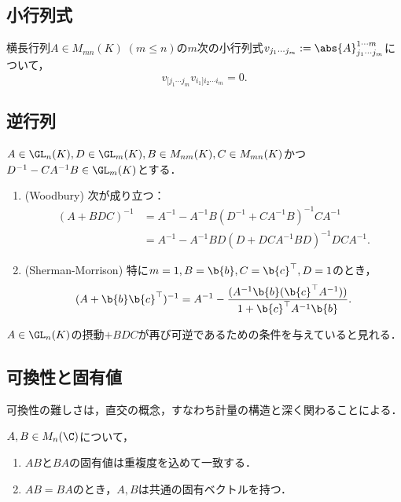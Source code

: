 \documentclass[uplatex, dvipdfmx]{jsreport}
\begin{document}
\subsection{小行列式}

\begin{proposition}
    横長行列$A\in M_{mn}(K)\;(m\le n)$の$m$次の小行列式$v_{j_1\cdots j_m}:=\abs{A}^{1\cdots m}_{j_1\cdots j_m}$について，
    \[v_{[j_1\cdots j_m}v_{i_1]i_2\cdots i_m}=0.\]
\end{proposition}

\subsection{逆行列}

\begin{proposition}
    $A\in \GL_n(K),D\in \GL_m(K),B\in M_{nm}(K),C\in M_{mn}(K)$かつ$D^{-1}-CA^{-1}B\in\GL_m(K)$とする．
    \begin{enumerate}
        \item (Woodbury) 次が成り立つ：
        \begin{align*}
            (A+BDC)^{-1}&=A^{-1}-A^{-1}B(D^{-1}+CA^{-1}B)^{-1}CA^{-1}\\
            &=A^{-1}-A^{-1}BD(D+DCA^{-1}BD)^{-1}DCA^{-1}.
        \end{align*}
        \item (Sherman-Morrison) 特に$m=1,B=\b{b},C=\b{c}^\top,D=1$のとき，
        \[(A+\b{b}\b{c}^\top)^{-1}=A^{-1}-\frac{(A^{-1}\b{b}(\b{c}^\top A^{-1}))}{1+\b{c}^\top A^{-1}\b{b}}.\]
    \end{enumerate}
\end{proposition}
\begin{remarks}
    $A\in\GL_n(K)$の摂動$+BDC$が再び可逆であるための条件を与えていると見れる．
\end{remarks}

\subsection{可換性と固有値}

\begin{tcolorbox}[colframe=ForestGreen, colback=ForestGreen!10!white,breakable,colbacktitle=ForestGreen!40!white,coltitle=black,fonttitle=\bfseries\sffamily,
title=]
    可換性の難しさは，直交の概念，すなわち計量の構造と深く関わることによる．
\end{tcolorbox}

\begin{theorem}
    $A,B\in M_n(\C)$について，
    \begin{enumerate}
        \item $AB$と$BA$の固有値は重複度を込めて一致する．
        \item $AB=BA$のとき，$A,B$は共通の固有ベクトルを持つ．
    \end{enumerate}
\end{theorem}
\end{document}
